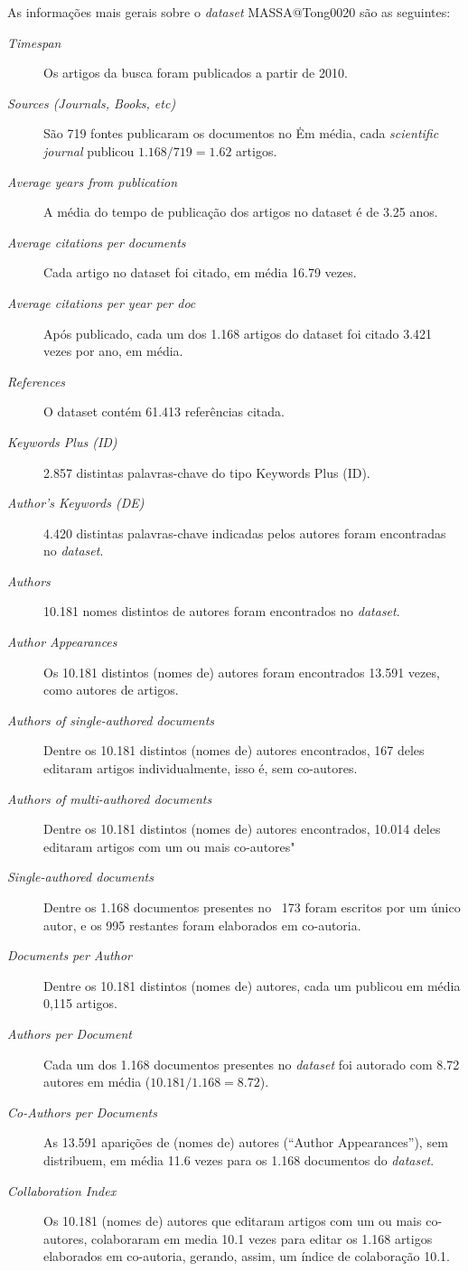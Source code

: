 As informações mais gerais sobre o \textit{dataset} MASSA@Tong0020 são as seguintes:
\begin{description}
    \item[\textit{Timespan}] Os artigos da busca foram publicados a partir de 2010.
    \item [\textit{Sources (Journals, Books, etc)}] São 719 fontes publicaram os documentos no \dataset\. Em média, cada \textit{scientific journal} publicou $1.168/719=1.62$ artigos.
     \item [\textit{Average years from publication}] A média do tempo de publicação dos artigos no dataset é de 3.25 anos.
     \item [\textit{Average citations per documents}] Cada artigo no dataset foi citado, em média 16.79 vezes.
     \item [\textit{Average citations per year per doc}] Após publicado, cada um dos 1.168 artigos do dataset foi citado 3.421 vezes por ano, em média.
    \item [\textit{References}] O dataset contém 61.413 referências citada.
    \item [\textit{Keywords Plus (ID)}] 2.857 distintas palavras-chave do tipo Keywords Plus (ID).
    \item [\textit{Author's Keywords (DE)}] 4.420 distintas palavras-chave indicadas pelos autores foram encontradas no \textit{dataset}.
     \item [\textit{Authors}] 10.181 nomes distintos de autores foram encontrados no \textit{dataset}.
    \item [\textit{Author Appearances}] Os 10.181 distintos (nomes de) autores foram encontrados 13.591 vezes, como autores de artigos.
    \item [\textit{Authors of single-authored documents}] Dentre os 10.181 distintos (nomes de) autores encontrados, 167 deles editaram artigos individualmente, isso é, sem co-autores.
    \item [\textit{Authors of multi-authored documents}] Dentre os 10.181 distintos (nomes de) autores encontrados, 10.014 deles editaram artigos com um ou mais co-autores"
    \item [\textit{Single-authored documents}] Dentre os 1.168 documentos presentes no \dataset\, 173 foram escritos por um único autor, e os 995 restantes foram elaborados em co-autoria.
    \item [\textit{Documents per Author}] Dentre os 10.181 distintos (nomes de) autores, cada um publicou em média 0,115 artigos.
    \item [\textit{Authors per Document}] Cada um dos 1.168 documentos presentes no \textit{dataset}  foi autorado com 8.72 autores em média ($10.181 / 1.168 = 8.72$).
    \item [\textit{Co-Authors per Documents}] As 13.591 aparições de (nomes de) autores (``Author Appearances''), sem distribuem, em média 11.6 vezes para os 1.168 documentos do \textit{dataset}.
    \item [\textit{Collaboration Index}] Os 10.181 (nomes de) autores que editaram artigos com um ou mais co-autores, colaboraram em media 10.1 vezes para editar os 1.168 artigos elaborados em co-autoria, gerando, assim, um índice de colaboração 10.1. 
    

\end{description}
